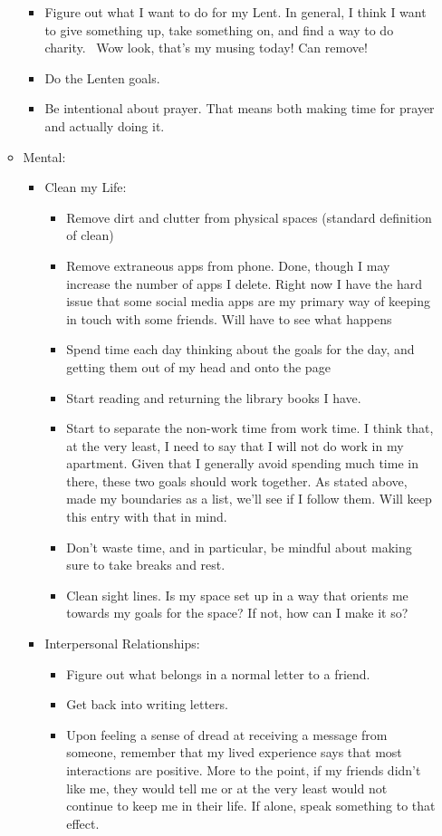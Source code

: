 \documentclass[12pt]{article}[titlepage]
\renewcommand{\,}{\textsuperscript{,}}
\begin{document}
\begin{itemize}
\begin{itemize}
\begin{itemize}
\item Figure out what I want to do for my Lent. In general, I think I want to give something up, take something on, and find a way to do charity.   
 Wow look, that's my musing today! Can remove!  
\item Do the Lenten goals.   
\item Be intentional about prayer. That means both making time for prayer and actually doing it.   
\end{itemize}   
\item Mental:   
\begin{itemize}   
\item Clean my Life:   
\begin{itemize}   
\item Remove dirt and clutter from physical spaces (standard definition of clean)   
\item Remove extraneous apps from phone.  
 Done, though I may increase the number of apps I delete. Right now I have the hard issue that some social media apps are my primary way of keeping in touch with some friends.  
Will have to see what happens  
\item Spend time each day thinking about the goals for the day, and getting them out of my head and onto the page  
\item Start reading and returning the library books I have.  
\item Start to separate the non-work time from work time. I think that, at the very least, I need to say that I will not do work in my apartment. Given that I generally avoid spending much time in there, these two goals should work together.   
As stated above, made my boundaries as a list, we'll see if I follow them. Will keep this entry with that in mind.  
\item Don't waste time, and in particular, be mindful about making sure to take breaks and rest.   
\item Clean sight lines. Is my space set up in a way that orients me towards my goals for the space? If not, how can I make it so?   
\end{itemize}   
\item Interpersonal Relationships:  
\begin{itemize}   
\item Figure out what belongs in a normal letter to a friend.  
\item Get back into writing letters.   
\item Upon feeling a sense of dread at receiving a message from someone, remember that my lived experience says that most interactions are positive. More to the point, if my friends didn't like me, they would tell me or at the very least would not continue to keep me in their life. If alone, speak something to that effect.   

\end{itemize}
\end{itemize}
\end{itemize}
\end{itemize}
\end{document}
